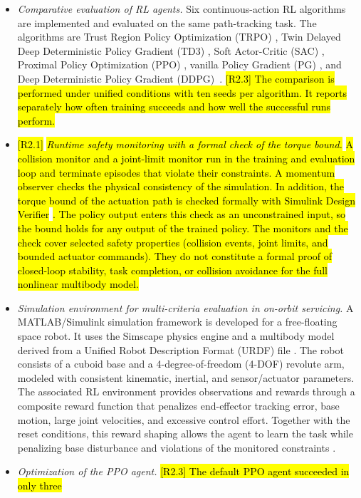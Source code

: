 \documentclass{ieeeaccess}
\newcommand{\hlone}[1]{{\sethlcolor{rone}\hl{#1}}}
\begin{document}
\begin{itemize}
  \item \textit{Comparative evaluation of RL agents.} Six continuous-action RL algorithms are implemented
  and evaluated on the same path-tracking task. The algorithms are Trust Region Policy Optimization
  (TRPO) \cite{b14}, Twin Delayed Deep Deterministic Policy Gradient (TD3) \cite{b17}, Soft Actor-Critic
  (SAC) \cite{b18}, Proximal Policy Optimization (PPO) \cite{b15}, vanilla Policy Gradient (PG)
  \cite{b21}, and Deep Deterministic Policy Gradient (DDPG)~\cite{b16}. \hlone{[R2.3] The
  comparison is performed under unified conditions with ten seeds per algorithm. It reports separately how
  often training succeeds and how well the successful runs perform.}
  \item \hlone{[R2.1]} \textit{\hlone{Runtime safety monitoring with a formal check of the
  torque bound.}} \hlone{A collision monitor and a joint-limit monitor run in the training and evaluation
  loop and terminate episodes that violate their constraints. A momentum observer checks the physical
  consistency of the simulation. In addition, the torque bound of the actuation path is checked formally
  with Simulink Design Verifier} \cite{b5}\hlone{. The policy output enters this check as an
  unconstrained input, so the bound holds for any output of the trained policy. The monitors and the
  check cover selected safety properties (collision events, joint limits, and bounded actuator commands).
  They do not constitute a formal proof of closed-loop stability, task completion, or collision avoidance
  for the full nonlinear multibody model.}
 \item \textit{Simulation environment for multi-criteria evaluation in on-orbit servicing.} A
 MATLAB/Simulink simulation framework is developed for a free-floating space robot. It uses the Simscape
 physics engine and a multibody model derived from a Unified Robot Description Format (URDF) file
 \cite{b25,b26,b27}. The robot consists of a cuboid base and a 4-degree-of-freedom (4-DOF) revolute arm,
 modeled with consistent kinematic, inertial, and sensor/actuator parameters. The associated RL
 environment provides observations and rewards through a composite reward function that penalizes
 end-effector tracking error, base motion, large joint velocities, and excessive control effort. Together
 with the reset conditions, this reward shaping allows the agent to learn the task while
 penalizing base disturbance and violations of the monitored constraints
 \cite{b7}.
 \item \textit{Optimization of the PPO agent.} \hlone{[R2.3] The default PPO agent succeeded in only three
}
\end{itemize}
\end{document}
